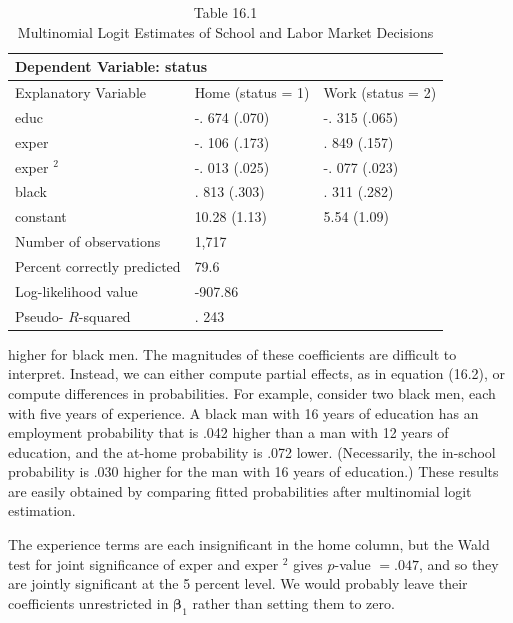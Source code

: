 \documentclass[10pt]{article}
\begin{document}
\begin{table}[h]
\begin{center}
\captionsetup{labelformat=empty}
\caption{Table 16.1\\
Multinomial Logit Estimates of School and Labor Market Decisions}
\begin{tabular}{|l|l|l|}
\hline
\multicolumn{3}{|l|}{Dependent Variable: status} \\
\hline
Explanatory Variable & Home (status = 1) & Work (status = 2) \\
\hline
educ & -. 674 (.070) & -. 315 (.065) \\
\hline
exper & -. 106 (.173) & . 849 (.157) \\
\hline
exper ${ }^{2}$ & -. 013 (.025) & -. 077 (.023) \\
\hline
black & . 813 (.303) & . 311 (.282) \\
\hline
constant & 10.28 (1.13) & 5.54 (1.09) \\
\hline
Number of observations & 1,717 &  \\
\hline
Percent correctly predicted & 79.6 &  \\
\hline
Log-likelihood value & -907.86 &  \\
\hline
Pseudo- $R$-squared & . 243 &  \\
\hline
\end{tabular}
\end{center}
\end{table}

higher for black men. The magnitudes of these coefficients are difficult to interpret. Instead, we can either compute partial effects, as in equation (16.2), or compute differences in probabilities. For example, consider two black men, each with five years of experience. A black man with 16 years of education has an employment probability that is .042 higher than a man with 12 years of education, and the at-home probability is .072 lower. (Necessarily, the in-school probability is .030 higher for the man with 16 years of education.) These results are easily obtained by comparing fitted probabilities after multinomial logit estimation.

The experience terms are each insignificant in the home column, but the Wald test for joint significance of exper and exper ${ }^{2}$ gives $p$-value $=.047$, and so they are jointly significant at the 5 percent level. We would probably leave their coefficients unrestricted in $\boldsymbol{\beta}_{1}$ rather than setting them to zero.
\end{document}
